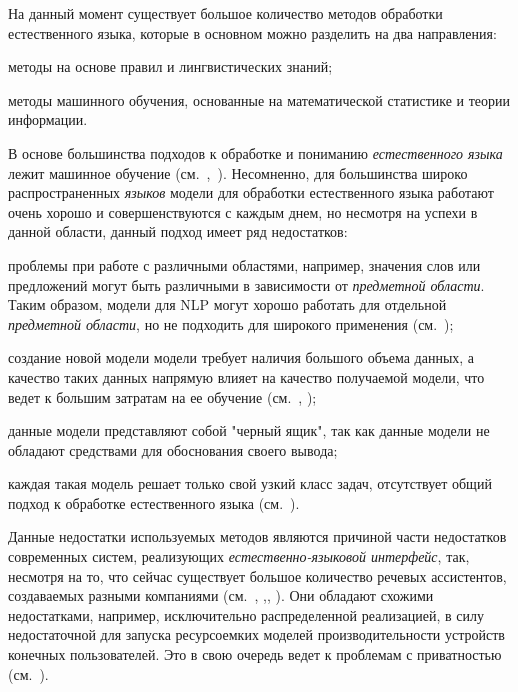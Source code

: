 На данный момент существует большое количество методов обработки естественного языка, которые в основном можно разделить на два направления:
\begin{textitemize}
	\item методы на основе правил и лингвистических знаний;
	\item методы машинного обучения, основанные на математической статистике и теории информации.
\end{textitemize}

В основе большинства подходов к обработке и пониманию \textit{естественного языка} лежит машинное обучение (см.~,~).
Несомненно, для большинства широко распространенных \textit{языков} модели для обработки естественного языка работают очень хорошо и совершенствуются с каждым днем, но несмотря на успехи в данной области, данный подход имеет ряд недостатков:
\begin{textitemize}
    \item проблемы при работе с различными областями, например, значения слов или предложений могут быть различными в зависимости от \textit{предметной области}.
    Таким образом, модели для NLP могут хорошо работать для отдельной \textit{предметной области}, но не подходить для широкого применения (см.~);
    \item создание новой модели модели требует наличия большого объема данных, а качество таких данных напрямую влияет на качество получаемой модели, что ведет к большим затратам на ее обучение (см.~, );
    \item данные модели представляют собой "черный ящик"{}, так как данные модели не обладают средствами для обоснования своего вывода;
    \item каждая такая модель решает только свой узкий класс задач, отсутствует общий подход к обработке естественного языка (см.~).
\end{textitemize}

Данные недостатки используемых методов являются причиной части недостатков современных систем, реализующих \textit{естественно-языковой интерфейс}, так, несмотря на то, что сейчас существует большое количество речевых ассистентов, создаваемых разными компаниями (см.~, ,, ).
Они обладают схожими недостатками, например, исключительно распределенной реализацией, в силу недостаточной для запуска ресурсоемких моделей производительности устройств конечных пользователей.
Это в свою очередь ведет к проблемам с приватностью (см.~).

